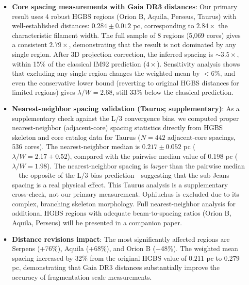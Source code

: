 \documentclass[twoside,twocolumn]{mnras}
\begin{document}
\begin{itemize}
    \item \textbf{Core spacing measurements with Gaia DR3 distances}: Our primary result uses 4 robust HGBS regions (Orion B, Aquila, Perseus, Taurus) with well-established distances: $0.284 \pm 0.012$ pc, corresponding to $2.84\times$ the characteristic filament width. The full sample of 8 regions (5,069 cores) gives a consistent $2.79\times$, demonstrating that the result is not dominated by any single region. After 3D projection correction, the inferred spacing is $\sim3.5\times$, within 15\% of the classical IM92 prediction ($4\times$). Sensitivity analysis shows that excluding any single region changes the weighted mean by $<6\%$, and even the conservative lower bound (reverting to original HGBS distances for limited regions) gives $\lambda/W = 2.68$, still 33\% below the classical prediction.

    \item \textbf{Nearest-neighbor spacing validation (Taurus; supplementary)}: As a supplementary check against the L/3 convergence bias, we computed proper nearest-neighbor (adjacent-core) spacing statistics directly from HGBS skeleton and core catalog data for Taurus ($N = 442$ adjacent-core spacings, 536 cores). The nearest-neighbor median is $0.217 \pm 0.052$ pc ($\lambda/W = 2.17 \pm 0.52$), compared with the pairwise median value of $0.198$ pc ($\lambda/W = 1.98$). The nearest-neighbor spacing is \textit{larger} than the pairwise median---the opposite of the L/3 bias prediction---suggesting that the sub-Jeans spacing is a real physical effect. This Taurus analysis is a supplementary cross-check, not our primary measurement. Ophiuchus is excluded due to its complex, branching skeleton morphology. Full nearest-neighbor analysis for additional HGBS regions with adequate beam-to-spacing ratios (Orion B, Aquila, Perseus) will be presented in a companion paper.

    \item \textbf{Distance revisions impact}: The most significantly affected regions are Serpens (+76\%), Aquila (+68\%), and Orion B (+48\%). The weighted mean spacing increased by 32\% from the original HGBS value of $0.211$ pc to $0.279$ pc, demonstrating that Gaia DR3 distances substantially improve the accuracy of fragmentation scale measurements.


\end{itemize}
\end{document}
